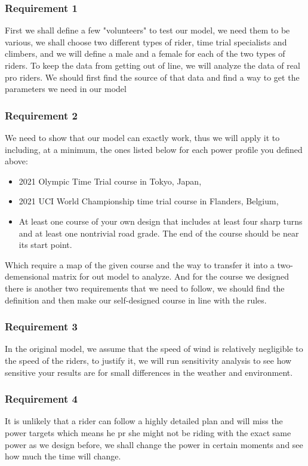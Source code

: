 \documentclass[12pt]{article}
\begin{document}
\subsubsection{Requirement 1}
First we shall define a few "volunteers" to test our model, we need them to be various, we shall choose two different types of rider, time trial
specialists and climbers, and we will define a male and a female for each of the two types of riders. To keep the data from getting out of line, we will analyze the data of
real pro riders. We should first find the source of that data and find a way to get the parameters we need in our model
\subsubsection{Requirement 2}
We need to show that our model can exactly work, thus we will apply it to including, at a minimum, the ones listed 
below for each power profile you defined above: 
\begin{itemize}
    \item 2021 Olympic Time Trial course in Tokyo, Japan,
    \item 2021 UCI World Championship time trial course in Flanders, Belgium,
    \item At least one course of your own design that includes at least four sharp turns and
    at least one nontrivial road grade. The end of the course should be near its start
    point.
\end{itemize}
 Which require a map of the given course and the way to transfer it into a two-demensional matrix for out model to analyze. And for the course we designed there is another two requirements that we need to follow, we should find the definition and then
 make our self-designed course in line with the rules. 
\subsubsection{Requirement 3}
 In the original model, we assume that the speed of wind is relatively negligible to the speed of the riders, to justify it, we will run sensitivity analysis to see how sensitive your results are for small differences in the weather
 and environment.
\subsubsection{Requirement 4}
It is unlikely that a rider can follow a highly detailed plan and will miss the power targets which means he pr she might not be riding with the exact same power as we design before, we shall change the power in certain moments and see how much the 
time will change. 
\end{document}
